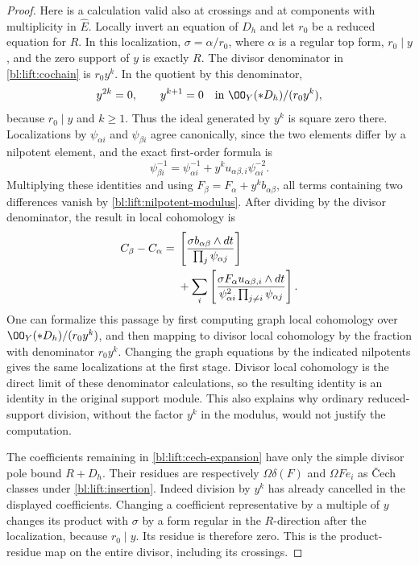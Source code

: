 \begin{proof}
Here is a calculation valid also at crossings and at components with
multiplicity in \(\widehat E\).  Locally invert an equation of \(D_h\)
and let \(r_0\) be a reduced equation for \(R\).  In this localization,
\(\sigma=\alpha/r_0\), where \(\alpha\) is a regular top form,
\(r_0\mid y\), and the zero support of \(y\) is exactly \(R\).
The divisor denominator in \eqref{bl:lift:cochain} is \(r_0y^k\).
In the quotient by this denominator,
\begin{equation}\label{bl:lift:nilpotent-modulus}
 y^{2k}=0,\qquad y^{k+1}=0
 \quad\text{in }\OO_Y(*D_h)/(r_0y^k),
\end{equation}
because \(r_0\mid y\) and \(k\geq1\).  Thus the ideal generated by
\(y^k\) is square zero there.  Localizations by
\(\psi_{\alpha i}\) and \(\psi_{\beta i}\) agree canonically,
since the two elements differ by a nilpotent element, and the exact
first-order formula is
\[
 \psi_{\beta i}^{-1}
 =\psi_{\alpha i}^{-1}
   +y^k u_{\alpha\beta,i}\psi_{\alpha i}^{-2}.
\]
Multiplying these identities and using
\(F_\beta=F_\alpha+y^kb_{\alpha\beta}\), all terms containing two
differences vanish by \eqref{bl:lift:nilpotent-modulus}.  After dividing
by the divisor denominator, the result in local cohomology is
\begin{align}\label{bl:lift:cech-expansion}
 C_\beta-C_\alpha
 ={}&\left[
  \frac{\sigma b_{\alpha\beta}\wedge dt}
       {\prod_j\psi_{\alpha j}}\right] \notag\\
 &+\sum_i\left[
  \frac{\sigma F_\alpha u_{\alpha\beta,i}\wedge dt}
       {\psi_{\alpha i}^{2}\prod_{j\ne i}\psi_{\alpha j}}
                    \right].
\end{align}
One can formalize this passage by first computing graph local cohomology
over \(\OO_Y(*D_h)/(r_0y^k)\), and then mapping to divisor local
cohomology by the fraction with denominator \(r_0y^k\).
Changing the graph equations by the indicated nilpotents gives the same
localizations at the first stage.  Divisor local cohomology is the direct
limit of these denominator calculations, so the resulting identity is
an identity in the original support module.  This also explains why
ordinary reduced-support division, without the factor \(y^k\) in the
modulus, would not justify the computation.

The coefficients remaining in \eqref{bl:lift:cech-expansion} have only the
simple divisor pole bound \(R+D_h\).  Their residues are respectively
\(\Omega\delta(F)\) and \(\Omega Fe_i\) as \v{C}ech classes under
\eqref{bl:lift:insertion}.  Indeed division by \(y^k\) has already
cancelled in the displayed coefficients.  Changing a coefficient
representative by a multiple of \(y\) changes its product with
\(\sigma\) by a form regular in the \(R\)-direction after the
localization, because \(r_0\mid y\).  Its residue is therefore zero.
This is the product-residue map on the entire divisor, including its
crossings.


\end{proof}
